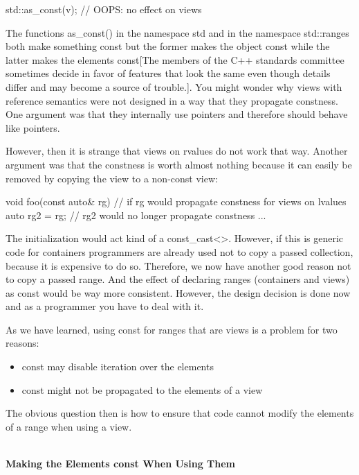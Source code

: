 \begin{cpp}
std::as_const(v); // OOPS: no effect on views
\end{cpp}

The functions as\_const() in the namespace std and in the namespace std::ranges both make something const but the former makes the object const while the latter makes the elements const[The members of the C++ standards committee sometimes decide in favor of features that look the same even though details differ and may become a source of trouble.]. You might wonder why views with reference semantics were not designed in a way that they propagate constness. One argument was that they internally use pointers and therefore should behave like pointers.

However, then it is strange that views on rvalues do not work that way. Another argument was that the constness is worth almost nothing because it can easily be removed by copying the view to a non-const view:

\begin{cpp}
void foo(const auto& rg) // if rg would propagate constness for views on lvalues
{
	auto rg2 = rg; // rg2 would no longer propagate constness
	...
}
\end{cpp}

The initialization would act kind of a const\_cast<>. However, if this is generic code for containers programmers are already used not to copy a passed collection, because it is expensive to do so. Therefore, we now have another good reason not to copy a passed range. And the effect of declaring ranges (containers and views) as const would be way more consistent. However, the design decision is done now and as a programmer you have to deal with it.


As we have learned, using const for ranges that are views is a problem for two reasons:

\begin{itemize}
\item
const may disable iteration over the elements

\item
const might not be propagated to the elements of a view
\end{itemize}

The obvious question then is how to ensure that code cannot modify the elements of a range when using a view.

\noindent
\hspace*{\fill} \\ %
\textbf{Making the Elements const When Using Them}

